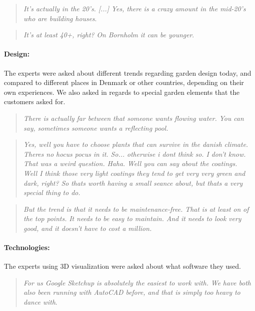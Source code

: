 		\begin{quote}
			\textit{It's actually in the 20's. [...] Yes, there is a crazy amount in the mid-20's who are building houses}\label{quote:expertClients3}.\\
		\end{quote}
		
		\begin{quote}
			\textit{It's at least 40+, right? On Bornholm it can be younger}\label{quote:expertClients4}.\\
		\end{quote}
		

		\paragraph*{Design:}
		The experts were asked about different trends regarding garden design today, and compared to different places in Denmark or other countries, depending on their own experiences. We also asked in regards to special garden elements that the customers asked for.

		
		\begin{quote}
			\textit{There is actually far between that someone wants flowing water. You can say, sometimes someone wants a reflecting pool.}\label{quote:expertDesign1}\\
		\end{quote}
		
		\begin{quote}
			\textit{Yes, well you have to choose plants that can survive in the danish climate. Theres no hocus pocus in it. So... otherwise i dont think so. I don't know. That was a weird question. Haha. Well you can say about the coatings. Well I think those very light coatings they tend to get very very green and dark, right? So thats worth having a small seance about, but thats a very special thing to do.}\label{quote:expertDesign2}\\
		\end{quote}
		
		\begin{quote}
			\textit{But the trend is that it needs to be maintenance-free. That is at least on of the top points. It needs to be easy to maintain. And it needs to look very good, and it doesn't have to cost a million.}\label{quote:expertDesign3}\\
		\end{quote}

		\paragraph*{Technologies:}
		The experts using 3D visualization were asked about what software they used.
		\begin{quote}
			\textit{For us Google Sketchup is absolutely the easiest to work with. We have both also been running with AutoCAD before, and that is simply too heavy to dance with}\label{quote:expertTech1}.\\
		\end{quote}
		
